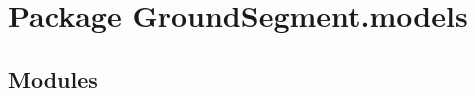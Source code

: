 %
%
%


\section{Package GroundSegment.models}

    \label{GroundSegment:models}


\subsection{Modules}

